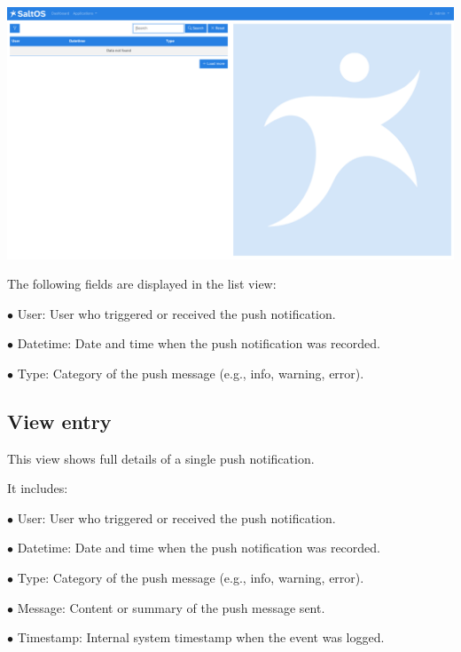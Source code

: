 \documentclass[a4paper]{article}
\begin{document}
\begin{center}\includegraphics[width=1\textwidth]{../ujest/snaps/test-screenshots-js-screenshots-common-pushlog-list-en-us-1-snap.png}\end{center}

The following fields are displayed in the list view:

\begin{compactitem}
\item[\color{myblue}$\bullet$] User: User who triggered or received the push notification.
\item[\color{myblue}$\bullet$] Datetime: Date and time when the push notification was recorded.
\item[\color{myblue}$\bullet$] Type: Category of the push message (e.g., info, warning, error).
\end{compactitem}

\hypertarget{toc24}{}
\subsection{View entry}

This view shows full details of a single push notification.

It includes:

\begin{compactitem}
\item[\color{myblue}$\bullet$] User: User who triggered or received the push notification.
\item[\color{myblue}$\bullet$] Datetime: Date and time when the push notification was recorded.
\item[\color{myblue}$\bullet$] Type: Category of the push message (e.g., info, warning, error).
\item[\color{myblue}$\bullet$] Message: Content or summary of the push message sent.
\item[\color{myblue}$\bullet$] Timestamp: Internal system timestamp when the event was logged.
\end{compactitem}
\end{document}

